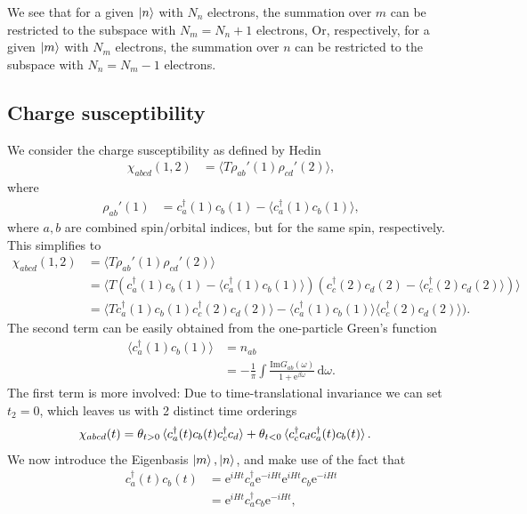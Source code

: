 \documentclass[12pt,a4paper]{scrartcl}
\numberwithin{equation}{section}
\begin{document}
We see that for a given $\ket{n}$ with $N_n$ electrons, the summation over $m$ can be restricted to the 
subspace with $N_m=N_n+1$ electrons, Or, respectively, 
for a given $\ket{m}$ with $N_m$ electrons, the summation over $n$ can be restricted to the 
subspace with $N_n=N_m-1$ electrons.


\subsection{Charge susceptibility}
We consider the charge susceptibility as defined by Hedin
\begin{align}
\chi_{abcd}(1,2) &=  \langle T \rho_{ab}'(1)\rho_{cd}'(2) \rangle,
\end{align}
where 
\begin{align}
 \rho_{ab}'(1) &= c^{\dagger}_a(1)c_b(1) - \langle c^{\dagger}_a(1)c_b(1) \rangle,
\end{align}
where $a,b$ are combined spin/orbital indices, but for the same spin, respectively.
This simplifies to
\begin{align}
\chi_{abcd}(1,2) &=  \langle T \rho_{ab}'(1)\rho_{cd}'(2) \rangle \\
&=\langle T (c^{\dagger}_a(1)c_b(1) - \langle c^{\dagger}_a(1)c_b(1)\rangle  )( c^{\dagger}_c(2)c_d(2) - \langle c^{\dagger}_c(2)c_d(2)\rangle ) \rangle \\
&=\langle T c^{\dagger}_a(1)c_b(1) c^{\dagger}_c(2)c_d(2) \rangle - \langle c^{\dagger}_a(1)c_b(1)\rangle\langle c^{\dagger}_c(2)c_d(2)\rangle ) .
\end{align}
The second term can be easily obtained from the one-particle Green's function
\begin{align}
 \langle c^{\dagger}_a(1)c_b(1)\rangle &= n_{ab}\\
 &=-\frac{1}{\pi} \int \frac{ \mathrm{Im}G_{ab}(\omega) }{1+\mathrm{e}^{\beta \omega}} \, \mathrm{d}\omega.
\end{align}
The first term is more involved:
Due to time-translational invariance we can set $t_2=0$, which leaves us with 
2 distinct time orderings
\begin{align}
\chi_{abcd}(t)
&= \theta_{t>0}\braket{c^{\dagger}_a(t)c_b(t) c^{\dagger}_c c_d  } + \theta_{t<0}\braket{c^{\dagger}_c   c_d    c^{\dagger}_a(t)c_b(t) } .
%
\end{align}
We now introduce the Eigenbasis $\ket{m},\ket{n}$, and make use of the fact that
\begin{align}
 c^{\dagger}_a(t) c_b(t) 
 &= \mathrm{e}^{iHt} c^{\dagger}_a \mathrm{e}^{-iHt} \mathrm{e}^{iHt} c_b \mathrm{e}^{-iHt} \\
 &= \mathrm{e}^{iHt} c^{\dagger}_a c_b \mathrm{e}^{-iHt},
\end{align}
\end{document}
